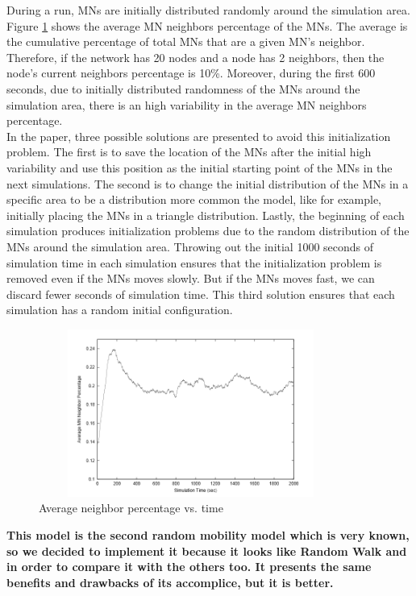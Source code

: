During a run, MNs are initially distributed randomly around the simulation area. Figure \ref{RandomWaypointFig2} shows the average MN neighbors percentage of the MNs. The average is the cumulative percentage of total MNs that are a given MN's neighbor. Therefore, if the network has 20 nodes and a node has 2 neighbors, then the node's current neighbors percentage is 10\%. Moreover, during the first 600 seconds, due to initially distributed randomness of the MNs around the simulation area, there is an high variability in the average MN neighbors percentage.\\
In the paper, three possible solutions are presented to avoid this initialization problem. The first is to save the location of the MNs after the initial high variability and use this position as the initial starting point of the MNs in the next simulations. The second is to change the initial distribution of the MNs in a specific area to be a distribution more common the model, like for example, initially placing the MNs in a triangle distribution. Lastly, the beginning of each simulation produces initialization problems due to the random distribution of the MNs around the simulation area. Throwing out the initial 1000 seconds of simulation time in each simulation ensures that the initialization problem is removed even if the MNs moves slowly. But if the MNs moves fast, we can discard fewer seconds of simulation time. This third solution ensures that each simulation has a random initial configuration.\\

\begin{figure}[h]
\center
\includegraphics[width=10cm,height=55mm]{../images/randomwaypoint2.png}
\caption{\label{RandomWaypointFig2}Average neighbor percentage vs. time\cite{SurveyMobilityModelsAdHoc1}}
\end{figure}

\textbf{This model is the second random mobility model which is very known, so we decided to implement it because it looks like Random Walk and in order to compare it with the others too. It presents the same benefits and drawbacks of its accomplice, but it is better.}\\

